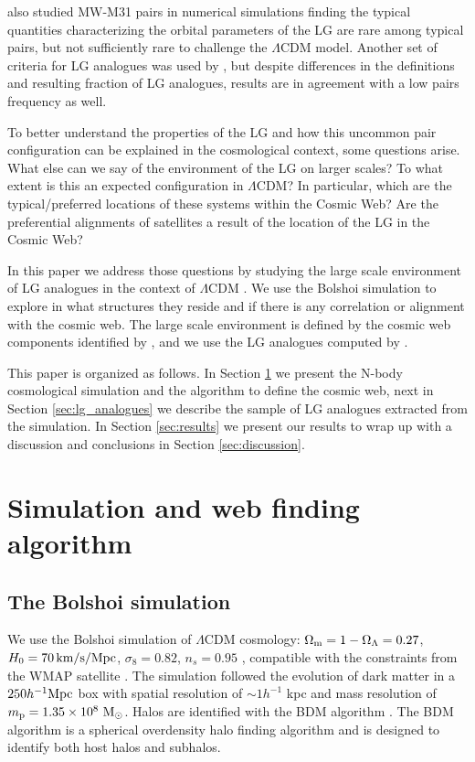 \documentclass{emulateapj}
\newcommand{\manuscript}{paper }
\newcommand{\lcdm}{$\Lambda$CDM }
\newcommand{\hmpc}{{\ifmmode{h^{-1}{\rm Mpc}}\else{$h^{-1}$Mpc }\fi}}
\begin{document}
\citet{2013ApJ...767L...5F} also studied MW-M31 pairs in numerical
simulations finding the typical quantities characterizing the orbital
parameters of the LG are rare among typical pairs, but not sufficiently rare to
challenge the \lcdm model.  
Another set of criteria for LG analogues was used
by \citet{2008MNRAS.384.1459L}, but despite differences in the
definitions and resulting fraction of LG analogues, results are in
agreement with a low pairs frequency as well.  



To better understand the properties of the LG and how this uncommon
pair configuration can be explained in the cosmological context, 
some questions arise. What else can we say of the environment of the
LG on larger scales? To what extent is this an expected configuration
in $\Lambda$CDM? In particular, which are the typical/preferred locations
of these systems within the Cosmic Web? Are the preferential
alignments of satellites a result of the location of the LG in the
Cosmic Web?


In this \manuscript we address those questions by studying the large
scale environment of LG  analogues in the context of \lcdm. 
We use the Bolshoi simulation to explore in what structures they
reside and if there is any correlation or alignment with the cosmic
web.  The large scale environment is defined by the cosmic web
components identified by \citet{Tweb}, and we use the LG analogues computed by
\citet{lganalogues}.  

   
This \manuscript is organized as follows. 
In Section \ref{sec:simulation}
we present the N-body cosmological simulation and the algorithm to
define the cosmic web, next in Section \ref{sec:lg_analogues} we describe the
sample of LG analogues extracted from the simulation. In
Section \ref{sec:results} we present our results to wrap up with a
discussion and conclusions in Section
\ref{sec:discussion}.



\section{Simulation and web finding algorithm}
\label{sec:simulation}

\subsection{The Bolshoi simulation}
We use the Bolshoi simulation of $\Lambda$CDM cosmology: $\Omega_{\rm
  m}=1-\Omega_{\Lambda}=0.27$, $H_0=70\,\rm km/s/Mpc$,
$\sigma_8=0.82$, $n_s=0.95$ \citep{2011ApJ...740..102K}, compatible
with the constraints from the WMAP satellite
\citep{hinshaw_etal13}. The simulation followed the evolution of dark
matter in a $250 \hmpc$ box with spatial resolution of $\sim
1h^{-1}$ kpc and mass resolution of $m_{\rm p}=1.35\times 10^8\ \rm
M_{\odot}$. Halos are identified with the BDM algorithm
\citep{1997astro.ph.12217K}. The BDM algorithm is  a spherical
overdensity halo finding algorithm and is designed to identify both
host halos and subhalos. 
\end{document}
